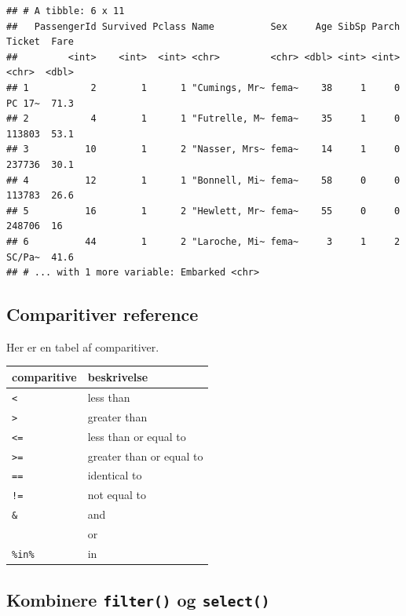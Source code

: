 \documentclass[
]{book}
\begin{document}
\begin{verbatim}
## # A tibble: 6 x 11
##   PassengerId Survived Pclass Name          Sex     Age SibSp Parch Ticket  Fare
##         <int>    <int>  <int> <chr>         <chr> <dbl> <int> <int> <chr>  <dbl>
## 1           2        1      1 "Cumings, Mr~ fema~    38     1     0 PC 17~  71.3
## 2           4        1      1 "Futrelle, M~ fema~    35     1     0 113803  53.1
## 3          10        1      2 "Nasser, Mrs~ fema~    14     1     0 237736  30.1
## 4          12        1      1 "Bonnell, Mi~ fema~    58     0     0 113783  26.6
## 5          16        1      2 "Hewlett, Mr~ fema~    55     0     0 248706  16  
## 6          44        1      2 "Laroche, Mi~ fema~     3     1     2 SC/Pa~  41.6
## # ... with 1 more variable: Embarked <chr>
\end{verbatim}

\hypertarget{comparitiver-reference}{%
\subsection{Comparitiver reference}\label{comparitiver-reference}}

Her er en tabel af comparitiver.

\begin{longtable}[]{@{}ll@{}}
\toprule
comparitive & beskrivelse \\
\midrule
\endhead
\texttt{\textless{}} & less than \\
\texttt{\textgreater{}} & greater than \\
\texttt{\textless{}=} & less than or equal to \\
\texttt{\textgreater{}=} & greater than or equal to \\
\texttt{==} & identical to \\
\texttt{!=} & not equal to \\
\texttt{\&} & and \\
\texttt{\textbar{}} & or \\
\texttt{\%in\%} & in \\
\bottomrule
\end{longtable}

\hypertarget{kombinere-filter-og-select}{%
\subsection{\texorpdfstring{Kombinere \texttt{filter()} og \texttt{select()}}{Kombinere filter() og select()}}\label{kombinere-filter-og-select}}
\end{document}
